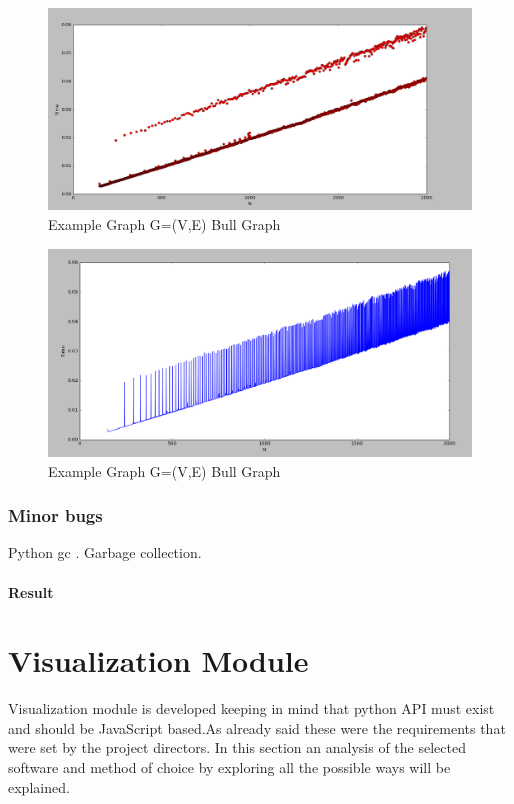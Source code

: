 \begin{figure}[H]
\centering
\includegraphics[scale=0.3]{e2000.png}
\caption{Example Graph G=(V,E) Bull Graph}
\end{figure}

\begin{figure}[H]
\centering
\includegraphics[scale=0.3]{e2000b.png}
\caption{Example Graph G=(V,E) Bull Graph}
\end{figure}

\subsection{Minor bugs}
Python gc . Garbage collection.

\subsubsection{Result}


\chapter{Visualization Module}
Visualization module is developed keeping in mind that python API must exist and should be JavaScript based.As already said these were the requirements that were set by the project directors. In this section an analysis of the selected software and method of choice by exploring all the possible ways will be explained. 
